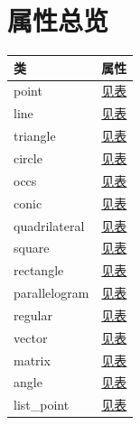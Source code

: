 \documentclass[
  DIV=16,
  fontsize=10,
  index=totoc,
  twoside,
  cadre,
  headings=small
]{tkz-doc-elements}
\begin{document}
\section*{属性总览}
\begin{tabular}{ll}
\textbf{类} & \textbf{属性} \\
\hline
point         & \hyperref[point:attributes]{见表}        \\
line          & \hyperref[line:attributes]{见表}         \\
triangle      & \hyperref[triangle:attributes]{见表}     \\
circle        & \hyperref[circle:attributes]{见表}       \\
occs          & \hyperref[occs:attributes]{见表}         \\
conic         & \hyperref[conic:attributes]{见表}        \\
quadrilateral & \hyperref[quadrilateral:attributes]{见表}\\
square        & \hyperref[square:attributes]{见表}       \\
rectangle     & \hyperref[rectangle:attributes]{见表}    \\
parallelogram & \hyperref[parallelogram:attributes]{见表}\\
regular       & \hyperref[regular:attributes]{见表}      \\
vector        & \hyperref[vector:attributes]{见表}       \\
matrix        & \hyperref[matrix:attributes]{见表}       \\
angle         & \hyperref[angle:attributes]{见表}        \\
list\_point   & \hyperref[list_point:attributes]{见表}   \\
\end{tabular}
\end{document}
